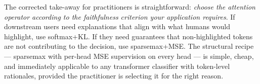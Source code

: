 \documentclass{article}
\begin{document}
The corrected take-away for practitioners is straightforward: \emph{choose the
attention operator according to the faithfulness criterion your application
requires}. If downstream users need explanations that align with what humans would
highlight, use softmax+KL. If they need guarantees that non-highlighted tokens are not
contributing to the decision, use sparsemax+MSE. The structural recipe ---
sparsemax with per-head MSE supervision on every head --- is simple, cheap, and
immediately applicable to any transformer classifier with token-level rationales,
provided the practitioner is selecting it for the right reason.



\end{document}
